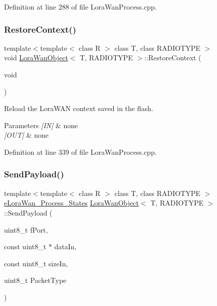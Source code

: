 Definition at line 288 of file Lora\+Wan\+Process.\+cpp.

\mbox{\label{class_lora_wan_object_a29662757556ca754ab1b314efd350a6c}} 
\subsubsection{\texorpdfstring{Restore\+Context()}{RestoreContext()}}
{\footnotesize\ttfamily template$<$template$<$ class R $>$ class T, class R\+A\+D\+I\+O\+T\+Y\+PE $>$ \\
void \mbox{\hyperlink{class_lora_wan_object}{Lora\+Wan\+Object}}$<$ T, R\+A\+D\+I\+O\+T\+Y\+PE $>$\+::Restore\+Context (\begin{DoxyParamCaption}\item[{void}]{ }\end{DoxyParamCaption})}



Reload the Lora\+W\+AN context saved in the flash. 


\begin{DoxyParams}{Parameters}
{\em \mbox{[}\+I\+N\mbox{]}} & none \\
\hline
{\em \mbox{[}\+O\+U\+T\mbox{]}} & none \\
\hline
\end{DoxyParams}


Definition at line 339 of file Lora\+Wan\+Process.\+cpp.

\mbox{\label{class_lora_wan_object_af5ed07270b8db6c03b6afeb9265fd2c1}} 
\subsubsection{\texorpdfstring{Send\+Payload()}{SendPayload()}}
{\footnotesize\ttfamily template$<$template$<$ class R $>$ class T, class R\+A\+D\+I\+O\+T\+Y\+PE $>$ \\
\mbox{\hyperlink{_define_8h_acabcd539e4bcc6575c90bd7d857b21f4}{e\+Lora\+Wan\+\_\+\+Process\+\_\+\+States}} \mbox{\hyperlink{class_lora_wan_object}{Lora\+Wan\+Object}}$<$ T, R\+A\+D\+I\+O\+T\+Y\+PE $>$\+::Send\+Payload (\begin{DoxyParamCaption}\item[{uint8\+\_\+t}]{f\+Port,  }\item[{const uint8\+\_\+t $\ast$}]{data\+In,  }\item[{const uint8\+\_\+t}]{size\+In,  }\item[{uint8\+\_\+t}]{Packet\+Type }\end{DoxyParamCaption})}




